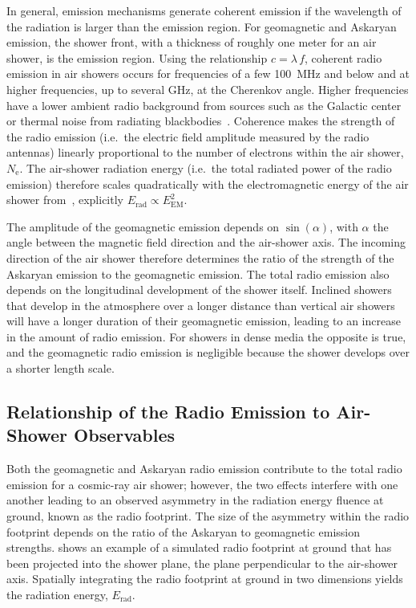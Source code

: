 In general, emission mechanisms generate coherent emission if the wavelength of the radiation is larger than the emission region.
For geomagnetic and Askaryan emission, the shower front, with a thickness of roughly one meter for an air shower, is the emission region.
Using the relationship $c = \lambda\,f$, coherent radio emission in air showers occurs for frequencies of a few \qty{100}{\mega\hertz} and below and at higher frequencies, up to several GHz, at the Cherenkov angle.
Higher frequencies have a lower ambient radio background from sources such as the Galactic center or thermal noise from radiating blackbodies~\cite{schroeder_ppnp2017_radio, tim_physrep2016_radio}.
Coherence makes the strength of the radio emission (i.e.~the electric field amplitude measured by the radio antennas) linearly proportional to the number of electrons within the air shower, $N_{\text{e}}$.
The air-shower radiation energy (i.e.~the total radiated power of the radio emission) therefore scales quadratically with the electromagnetic energy of the air shower from~, explicitly $E_{\text{rad}} \propto E_{\text{EM}}^{2}$.

The amplitude of the geomagnetic emission depends on $\sin\left(\alpha\right)$, with $\alpha$ the angle between the magnetic field direction and the air-shower axis.
The incoming direction of the air shower therefore determines the ratio of the strength of the Askaryan emission to the geomagnetic emission.
The total radio emission also depends on the longitudinal development of the shower itself.
Inclined showers that develop in the atmosphere over a longer distance than vertical air showers will have a longer duration of their geomagnetic emission, leading to an increase in the amount of radio emission.
For showers in dense media the opposite is true, and the geomagnetic radio emission is negligible because the shower develops over a shorter length scale. 

\subsection{Relationship of the Radio Emission to Air-Shower Observables}\label{ssec:radio_observables}
Both the geomagnetic and Askaryan radio emission contribute to the total radio emission for a cosmic-ray air shower; however, the two effects interfere with one another leading to an observed asymmetry in the radiation energy fluence at ground, known as the radio footprint.
The size of the asymmetry within the radio footprint depends on the ratio of the Askaryan to geomagnetic emission strengths.
 shows an example of a simulated radio footprint at ground that has been projected into the shower plane, the plane perpendicular to the air-shower axis.
Spatially integrating the radio footprint at ground in two dimensions yields the radiation energy, $E_{\text{rad}}$.

